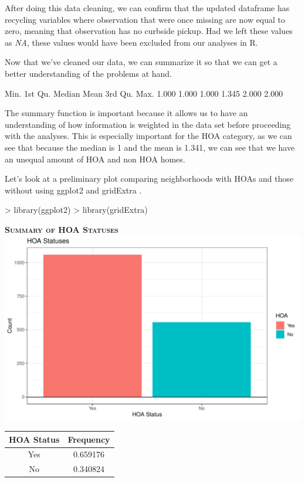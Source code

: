 \documentclass{article}
\begin{document}
After doing this data cleaning, we can confirm that the updated dataframe has recycling variables where observation that were once missing are now equal to zero, meaning that observation has no curbside pickup. Had we left these values as \textit{NA}, these values would have been excluded from our analyses in R. 


Now that we've cleaned our data, we can summarize it so that we can get a better understanding of the problems at hand.


\begin{Schunk}
\begin{Soutput}
   Min. 1st Qu.  Median    Mean 3rd Qu.    Max. 
  1.000   1.000   1.000   1.345   2.000   2.000 
\end{Soutput}
\end{Schunk}

The summary function is important because it allows us to have an understanding of how information is weighted in the data set before proceeding with the analyses. This is especially important for the HOA category, as we can see that because the median is 1 and the mean is 1.341, we can see that we have an unequal amount of HOA and non HOA homes. 


Let's look at a preliminary plot comparing neighborhoods with HOAs and those without using ggplot2 \cite{ggplot2} and gridExtra \cite{gridExtra}.
\begin{Schunk}
\begin{Sinput}
> library(ggplot2)
> library(gridExtra)
\end{Sinput}
\end{Schunk}

\newpage
\textsc{\textbf{Summary of HOA Statuses}}
\newline
\newline
\includegraphics{part2-008}
\begin{table}[h]
\begin{tabular}{|c|c|} \hline
HOA Status & Frequency \\ \hline
Yes        & 0.659176  \\ \hline
No         & 0.340824 \\ \hline
\end{tabular}
\end{table}
\end{document}

